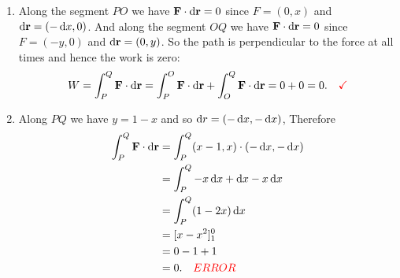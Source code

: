 \begin{enumerate}[label=(\alph*)]
\item Along the segment $PO$ we have $\F \cdot \d\r = 0$ since $F = (0, x)$ and $\d\r = (-\dx,
  0)$. And along the segment $OQ$ we have $\F \cdot \d\r = 0$ since $F = (-y, 0)$ and
  $\d\r = (0, y)$. So the path is perpendicular to the force at all times and hence the work is
  zero:
  \begin{align*}
    W
    = \int_P^Q \F \cdot \d\r
    = \int_P^O \F \cdot \d\r + \int_O^Q \F \cdot \d\r
    = 0 + 0 = 0. ~~~\red{\checkmark}
  \end{align*}
\item Along $PQ$ we have $y = 1 - x$ and so $\dr = (-\dx, -\dx)$, Therefore
  \begin{align*}
    \int_P^Q \F \cdot \d\r
    &= \int_P^Q (x - 1, x) \cdot (-\dx, -\dx) \\
    &= \int_P^Q -x\dx + \dx - x\dx \\
    &= \int_P^Q (1 - 2x)\dx \\
    &= [x - x^2]_1^0 \\
    &= 0 - 1 + 1 \\
    &= 0. ~~~ \red{ERROR}
  \end{align*}
\end{enumerate}
